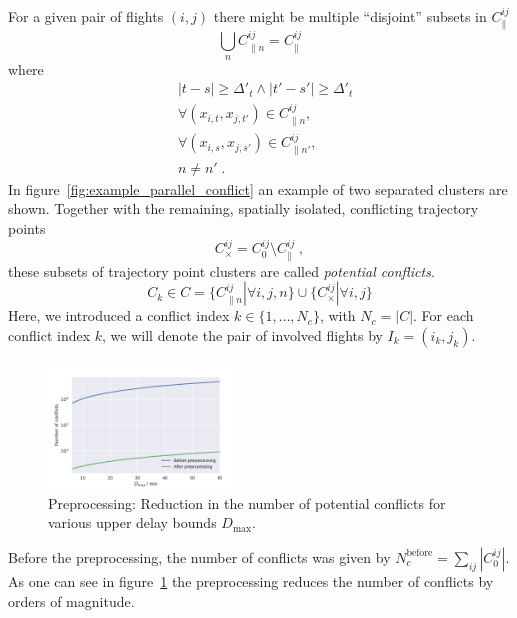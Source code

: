For a given pair of flights $(i, j)$ there might be multiple ``disjoint'' subsets in $C^{ij}_\parallel$
\begin{equation*}
    \bigcup_{n} C^{ij}_{\parallel n} = C^{ij}_\parallel
\end{equation*}
where
\begin{align*}
    & |t - s| \geq \Delta'_t \land |t' - s'| \geq \Delta'_t \\
    & \forall (x_{i, t},  x_{j, t'}) \in C^{ij}_{\parallel n}, \\
    & \forall (x_{i, s},  x_{j, s'}) \in C^{ij}_{\parallel n'}, \\
    & n \neq n' \; .
\end{align*}
In figure~\ref{fig:example_parallel_conflict} an example of two separated clusters are shown.
Together with the remaining, spatially isolated, conflicting trajectory points
\begin{equation*}
    C^{ij}_{\times} = C^{ij}_0 \setminus C^{ij}_\parallel \; ,
\end{equation*}
these subsets of trajectory point clusters are called \emph{potential conflicts}.
\begin{equation*}
    C_k \in C = \{ C^{ij}_{\parallel n} | \forall i, j, n\} \cup  \{C^{ij}_{\times} | \forall i, j\}
\end{equation*}
Here, we introduced a conflict index $k\in\{1, \dots, N_c\}$, with $N_c = |C|$.
For each conflict index $k$, we will denote the pair of involved flights by $I_k = (i_k, j_k)$.

\begin{figure}[t]
    \begin{center}
        \includegraphics[width=0.45\textwidth]{./pics/preprocessing_reduction_number_of_conflicts.pdf}
    \end{center}
    \caption{Preprocessing: Reduction in the number of potential conflicts for various upper delay bounds $D_\text{max}$.}
\label{fig:preprocessing_reduction_number_of_conflicts}
\end{figure}

Before the preprocessing, the number of conflicts was given by $N_c^\text{before} = \sum_{ij} |C^{ij}_0|$.
As one can see in figure~\ref{fig:preprocessing_reduction_number_of_conflicts} the preprocessing reduces the number of conflicts by orders of magnitude.

